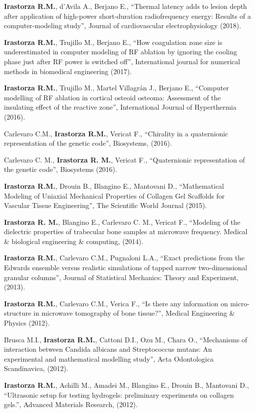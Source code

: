 \documentclass[margin,line]{res}
\begin{document}
\begin{resume}
\textbf{Irastorza R.M.}, d'Avila A., Berjano E., ``Thermal latency adds to lesion depth after application of high‐power short‐duration radiofrequency energy: Results of a computer‐modeling study'', Journal of cardiovascular electrophysiology (2018).

\textbf{Irastorza R.M.}, Trujillo M., Berjano E., ``How coagulation zone size is underestimated in computer modeling of RF ablation by ignoring the cooling phase just after RF power is switched off'', International journal for numerical methods in biomedical engineering (2017).

\textbf{Irastorza R.M.}, Trujillo M., Martel Villagrán J., Berjano E., ``Computer modelling of RF ablation in cortical osteoid osteoma: Assessment of the insulating effect of the reactive zone'', International Journal of Hyperthermia (2016).

Carlevaro C.M., {\bf Irastorza R.M.}, Vericat F., ``Chirality in a quaternionic representation of the genetic code'', Biosystems, (2016).

Carlevaro C. M., \textbf{Irastorza R. M.}, Vericat F., ``Quaternionic representation of the genetic code'', Biosystems (2016).

\textbf{Irastorza R.M.}, Drouin B., Blangino E., Mantovani D., ``Mathematical Modeling of Uniaxial Mechanical Properties of Collagen Gel Scaffolds for Vascular Tissue Engineering'', The Scientific World Journal (2015).

\textbf{Irastorza R. M.}, Blangino E., Carlevaro C. M., Vericat F., ``Modeling of the dielectric properties of trabecular bone samples at microwave frequency. Medical \& biological engineering \& computing, (2014).

\textbf{Irastorza R.M.}, Carlevaro C.M., Pugnaloni L.A., ``Exact predictions from the Edwards ensemble versus realistic simulations of tapped narrow two-dimensional granular columns'', Journal of Statistical Mechanics: Theory and Experiment, (2013).

\textbf{Irastorza R.M.}, Carlevaro C.M., Verica F., ``Is there any information on micro-structure in microwave tomography of bone tissue?'', Medical Engineering \& Physics (2012).

Brusca M.I., {\bf Irastorza R.M.}, Cattoni D.I., Ozu M., Chara O., ``Mechanisms of interaction between Candida albicans and Streptococcus mutans: An experimental and mathematical modelling study'', Acta Odontologica Scandinavica, (2012).

\textbf{Irastorza R.M.}, Achilli M., Amadei M., Blangino E., Drouin B., Mantovani D., ``Ultrasonic setup for testing hydrogels: preliminary experiments on collagen gels.'', Advanced Materials Research, (2012).


\end{resume}
\end{document}
